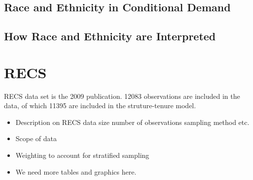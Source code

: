 \documentclass{article}
\begin{document}




  \subsection{Race and Ethnicity in Conditional Demand}
  
  \subsection{How Race and Ethnicity are Interpreted}

\section{RECS}

RECS data set is the 2009 publication.  12083 observations are included in the data, of which 11395 are included in the struture-tenure model.
\begin{itemize}
  \item Description on RECS data size number of observations sampling method etc.
  \item Scope of data  
  \item Weighting to account for stratified sampling
  \item We need more tables and graphics here.
\end{itemize}
\end{document}
